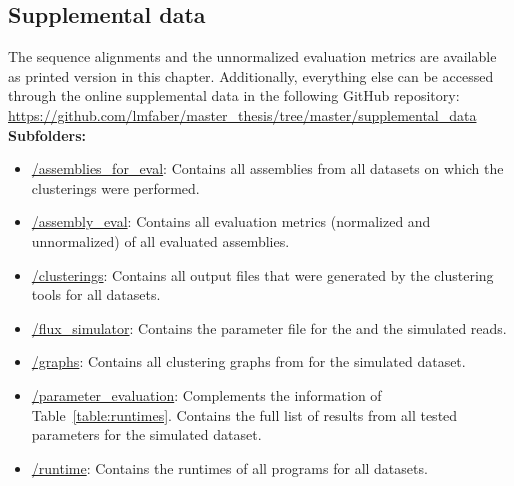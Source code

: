 \documentclass[12pt,a4paper,english]{article}
\begin{document}
\subsection{Supplemental data}
\label{appendix:supplements}
The sequence alignments and the unnormalized evaluation metrics are available as printed version in this chapter. Additionally, everything else can be accessed through the online supplemental data in the following GitHub repository:\\
\href{https://github.com/lmfaber/master_thesis/tree/master/supplemental_data}{https://github.com/lmfaber/master\_thesis/tree/master/supplemental\_data}\\
\textbf{Subfolders:}
\begin{itemize}
	\item \href{https://github.com/lmfaber/master_thesis/tree/master/supplemental_data/assemblies_for_eval}{/assemblies\_for\_eval}: Contains all assemblies from all datasets on which the clusterings were performed.
	\item \href{https://github.com/lmfaber/master_thesis/tree/master/supplemental_data/assembly_eval}{/assembly\_eval}: Contains all evaluation metrics (normalized and unnormalized) of all evaluated assemblies.
	\item \href{https://github.com/lmfaber/master_thesis/tree/master/supplemental_data/clusterings}{/clusterings}: Contains all output files that were generated by the clustering tools for all datasets.
	\item \href{https://github.com/lmfaber/master_thesis/tree/master/supplemental_data/flux_simulator}{/flux\_simulator}: Contains the parameter file for the \flux and the simulated reads.
	\item \href{https://github.com/lmfaber/master_thesis/tree/master/supplemental_data/graphs}{/graphs}: Contains all clustering graphs from \karma for the simulated \celegans dataset.
	\item \href{https://github.com/lmfaber/master_thesis/tree/master/supplemental_data/parameter\_evaluation}{/parameter\_evaluation}: Complements the information of Table~\ref{table:runtimes}. Contains the full list of results from all tested parameters for the simulated \celegans dataset.
	\item \href{https://github.com/lmfaber/master_thesis/tree/master/supplemental_data/runtime}{/runtime}: Contains the runtimes of all programs for all datasets.


\end{itemize}
\end{document}
